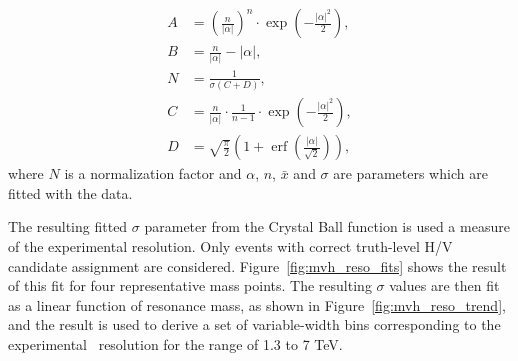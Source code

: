 \begin{align*}
A &= \left(\frac{n}{\left| \alpha \right|}\right)^n \cdot \exp\left(- \frac {\left| \alpha \right|^2}{2}\right),\\
B &= \frac{n}{\left| \alpha \right|}  - \left| \alpha \right|,\\
N &= \frac{1}{\sigma (C + D)},\\
C &= \frac{n}{\left| \alpha \right|} \cdot \frac{1}{n-1} \cdot \exp\left(- \frac {\left| \alpha \right|^2}{2}\right),\\
D &= \sqrt{\frac{\pi}{2}} \left(1 + \operatorname{erf}\left(\frac{\left| \alpha \right|}{\sqrt 2}\right)\right),
\end{align*}
 where $N$ is a normalization factor and $\alpha$, $n$, $\bar x$ and $\sigma$ are parameters which are fitted with the data.

The resulting fitted $\sigma$ parameter from the Crystal Ball function is used a measure of the experimental resolution.
Only events with correct truth-level H/V candidate assignment are considered.
Figure~\ref{fig:mvh_reso_fits} shows the result of this fit for four representative mass points.
The resulting $\sigma$ values are then fit as a linear function of resonance mass, as shown in Figure~\ref{fig:mvh_reso_trend}, and the result is used to derive a set of variable-width bins corresponding to the experimental \mvh\ resolution for the range of 1.3 to 7 TeV.

